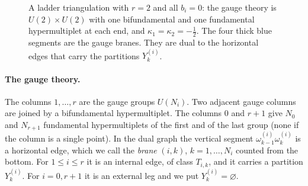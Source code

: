 \documentclass[11pt]{article}
\theoremstyle{plain}
\theoremstyle{definition}
\theoremstyle{remark}
\newcommand{\es}{\varnothing}
\begin{document}
\begin{figure}[ht]
\centering
{}
\caption{A ladder triangulation with $r=2$ and all $b_i=0$: the gauge theory is
$U(2)\times U(2)$ with one bifundamental and one fundamental hypermultiplet at each end, and
$\kappa_1=\kappa_2=-\tfrac12$. The four thick blue segments are the gauge branes. They are dual
to the horizontal edges that carry the partitions $Y^{(i)}_k$.}\label{fig:quiver}
\end{figure}

\paragraph{The gauge theory.} The columns $1,\ldots,r$ are the gauge groups $U(N_i)$. Two
adjacent gauge columns are joined by a bifundamental hypermultiplet. The columns $0$ and $r+1$ give $N_0$
and $N_{r+1}$ fundamental hypermultiplets of the first and of the last group (none if the column
is a single point). In the dual graph the vertical segment $\omega^{(i)}_{k-1}\omega^{(i)}_k$ is
a horizontal edge, which we call the \textit{brane} $(i,k)$, $k=1,\ldots,N_i$ counted from the
bottom. For $1\le i\le r$ it is an internal edge, of class $T_{i,k}$, and it carries a partition
$Y^{(i)}_k$. For $i=0,r+1$ it is an external leg and we put $Y^{(i)}_k=\es$.
\end{document}
